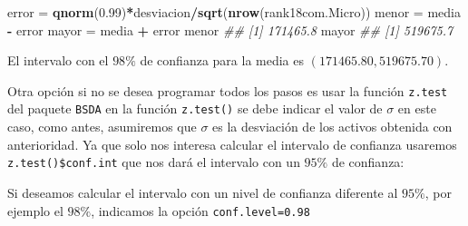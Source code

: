 \documentclass[letterpaper,]{book}
\newenvironment{Shaded}{\begin{snugshade}}{\end{snugshade}}
\newcommand{\CommentTok}[1]{\textcolor[rgb]{0.56,0.35,0.01}{\textit{#1}}}
\newcommand{\DataTypeTok}[1]{\textcolor[rgb]{0.13,0.29,0.53}{#1}}
\newcommand{\FloatTok}[1]{\textcolor[rgb]{0.00,0.00,0.81}{#1}}
\newcommand{\KeywordTok}[1]{\textcolor[rgb]{0.13,0.29,0.53}{\textbf{#1}}}
\newcommand{\NormalTok}[1]{#1}
\newcommand{\OperatorTok}[1]{\textcolor[rgb]{0.81,0.36,0.00}{\textbf{#1}}}
\newcommand{\StringTok}[1]{\textcolor[rgb]{0.31,0.60,0.02}{#1}}
\begin{document}
\begin{Shaded}
\begin{Highlighting}[]

\NormalTok{error  =}\StringTok{ }\KeywordTok{qnorm}\NormalTok{(}\FloatTok{0.99}\NormalTok{)}\OperatorTok{*}\NormalTok{desviacion}\OperatorTok{/}\KeywordTok{sqrt}\NormalTok{(}\KeywordTok{nrow}\NormalTok{(rank18com.Micro))}
\NormalTok{menor =}\StringTok{ }\NormalTok{media }\OperatorTok{-}\StringTok{ }\NormalTok{error}
\NormalTok{mayor =}\StringTok{ }\NormalTok{media }\OperatorTok{+}\StringTok{ }\NormalTok{error}
\NormalTok{menor}
\CommentTok{## [1] 171465.8}
\NormalTok{mayor}
\CommentTok{## [1] 519675.7}
\end{Highlighting}
\end{Shaded}

El intervalo con el \(98\%\) de confianza para la media es \(\left( 171465.80, 519675.70 \right)\).

Otra opción si no se desea programar todos los pasos es usar la función \texttt{z.test} del paquete \texttt{BSDA} en la función \texttt{z.test()} se debe indicar el valor de \(\sigma\) en este caso, como antes, asumiremos que \(\sigma\) es la desviación de los activos obtenida con anterioridad. Ya que solo nos interesa calcular el intervalo de confianza usaremos \texttt{z.test()\$conf.int} que nos dará el intervalo con un \(95\%\) de confianza:

\begin{Shaded}
\end{Shaded}

Si deseamos calcular el intervalo con un nivel de confianza diferente al \(95\%\), por ejemplo el \(98\%\), indicamos la opción \texttt{conf.level=0.98}

\begin{Shaded}
\end{Shaded}
\end{document}
